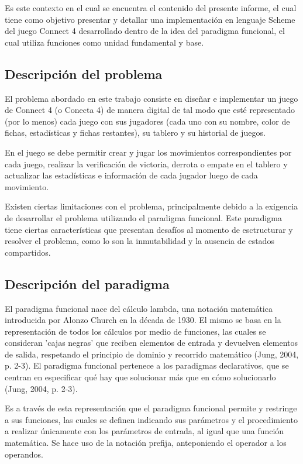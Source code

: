 \documentclass[12pt]{article}
\begin{document}
    Es este contexto en el cual se encuentra el contenido del presente informe, el cual tiene como objetivo presentar y detallar una implementación en lenguaje Scheme del juego Connect 4 desarrollado dentro de la idea del paradigma funcional, el cual utiliza funciones como unidad fundamental y base.
    
    \subsection{Descripción del problema}
    
    El problema abordado en este trabajo consiste en diseñar e implementar un juego de Connect 4 (o Conecta 4) de manera digital de tal modo que esté representado (por lo menos) cada juego con sus jugadores (cada uno con su nombre, color de fichas, estadísticas y fichas restantes), su tablero y su historial de juegos.
    
    En el juego se debe permitir crear y jugar los movimientos correspondientes por cada juego, realizar la verificación de victoria, derrota o empate en el tablero y actualizar las estadísticas e información de cada jugador luego de cada movimiento.
    
    Existen ciertas limitaciones con el problema, principalmente debido a la exigencia de desarrollar el problema utilizando el paradigma funcional. Este paradigma tiene ciertas características que presentan desafíos al momento de esctructurar y resolver el problema, como lo son la inmutabilidad y la ausencia de estados compartidos.
    
    \subsection{Descripción del paradigma}
    
    El paradigma funcional nace  del cálculo lambda, una notación matemática introducida por Alonzo Church en la década de 1930. El mismo se basa en la representación de todos los cálculos por medio de funciones, las cuales se consideran 'cajas negras' que reciben elementos de entrada y devuelven elementos de salida, respetando el principio de dominio y recorrido matemático (Jung, 2004, p. 2-3). El paradigma funcional pertenece a los paradigmas declarativos, que se centran en especificar qué hay que solucionar más que en cómo solucionarlo (Jung, 2004, p. 2-3).
    
    Es a través de esta representación que el paradigma funcional permite y restringe a sus funciones, las cuales se definen indicando sus parámetros y el procedimiento a realizar únicamente con los parámetros de entrada, al igual que una función matemática. Se hace uso de la notación
    prefija, anteponiendo el operador a los operandos.
    
\end{document}
